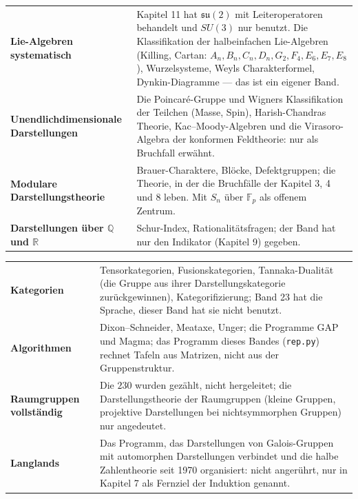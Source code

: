 \begin{merksatz}
\begin{center}
{\small
\renewcommand{\arraystretch}{1.45}
\begin{tabular}{@{}P{3.2cm}P{5.4cm}@{}}
\toprule
\textbf{Lie-Algebren systematisch} & Kapitel 11 hat $\mathfrak{su}(2)$ mit Leiteroperatoren behandelt und $SU(3)$ nur benutzt. Die Klassifikation der halbeinfachen Lie-Algebren (Killing, Cartan: $A_n, B_n, C_n, D_n, G_2, F_4, E_6, E_7, E_8$), Wurzelsysteme, Weyls Charakterformel, Dynkin-Diagramme --- das ist ein eigener Band.\\
\textbf{Unendlich\-dimensionale Darstellungen} & Die Poincaré-Gruppe und Wigners Klassifikation der Teilchen (Masse, Spin), Harish-Chandras Theorie, Kac--Moody-Algebren und die Virasoro-Algebra der konformen Feldtheorie: nur als Bruchfall erwähnt.\\
\textbf{Modulare Darstellungstheorie} & Brauer-Charaktere, Blöcke, Defektgruppen; die Theorie, in der die Bruchfälle der Kapitel 3, 4 und 8 leben. Mit $S_n$ über $\mathbb F_p$ als offenem Zentrum.\\
\textbf{Darstellungen über $\mathbb Q$ und $\mathbb R$} & Schur-Index, Rationalitätsfragen; der Band hat nur den Indikator (Kapitel 9) gegeben.\\
\bottomrule
\end{tabular}}
\end{center}
\begin{center}
{\small
\renewcommand{\arraystretch}{1.45}
\begin{tabular}{@{}P{3.2cm}P{5.4cm}@{}}
\toprule
\textbf{Kategorien} & Tensorkategorien, Fusionskategorien, Tannaka-Dualität (die Gruppe aus ihrer Darstellungskategorie zurückgewinnen), Kategorifizierung; Band 23 hat die Sprache, dieser Band hat sie nicht benutzt.\\
\textbf{Algorithmen} & Dixon--Schneider, Meataxe, Unger; die Programme GAP und Magma; das Programm dieses Bandes (\texttt{rep.py}) rechnet Tafeln aus Matrizen, nicht aus der Gruppenstruktur.\\
\textbf{Raumgruppen vollständig} & Die $230$ wurden gezählt, nicht hergeleitet; die Darstellungstheorie der Raumgruppen (kleine Gruppen, projektive Darstellungen bei nichtsymmorphen Gruppen) nur angedeutet.\\
\textbf{Langlands} & Das Programm, das Darstellungen von Galois-Gruppen mit automorphen Darstellungen verbindet und die halbe Zahlentheorie seit 1970 organisiert: nicht angerührt, nur in Kapitel 7 als Fernziel der Induktion genannt.\\
\bottomrule
\end{tabular}}
\end{center}
\end{merksatz}


